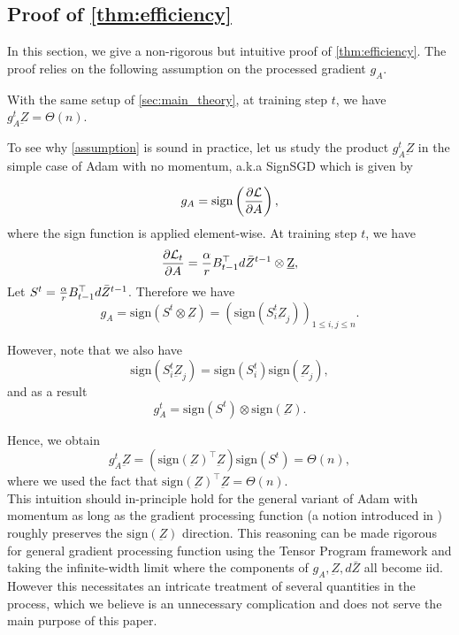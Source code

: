 \subsection{Proof of \texorpdfstring{\cref{thm:efficiency}}{Theorem Efficiency}}


In this section, we give a non-rigorous but intuitive proof of \cref{thm:efficiency}. The proof relies on the following assumption on the processed gradient $g_A$.

\begin{assumption}\label{assumption}
With the same setup of \cref{sec:main_theory}, at training step $t$, we have $g_A^{t} \underbar{Z} = \Theta(n)$.    
\end{assumption}
To see why \cref{assumption} is sound in practice, let us study the product $g_A^{t} \underbar{Z}$ in the simple case of Adam with no momentum, a.k.a SignSGD which is given by  

$$
g_A = \textrm{sign}\left(\frac{\partial \mathcal{L}}{\partial A}\right),
$$
where the sign function is applied element-wise. At training step $t$, we have 
$$
\frac{\partial \mathcal{L}_{t}}{\partial A} = \frac{\alpha}{r} B^\top_{t-1} d\Bar{Z}^{t-1} \otimes \underbar{Z},
$$
Let $S^t = \frac{\alpha}{r} B^\top_{t-1} d\Bar{Z}^{t-1}$. Therefore we have 
$$
g_A = \textrm{sign}(S^t \otimes \underbar{Z}) = (\textrm{sign}(S^t_{i} \underbar{Z}_j))_{1\leq i, j \leq n}.
$$

However, note that we also have 
$$
\textrm{sign}(S^t_{i} \underbar{Z}_j) = \textrm{sign}(S^t_{i}) \textrm{sign}(\underbar{Z}_j),
$$
and as a result  
$$
g_A^{t} = \textrm{sign}(S^t) \otimes \textrm{sign}(\underbar{Z}).
$$

Hence, we obtain 
$$
g_A^{t} \underbar{Z} = (\textrm{sign}(\underbar{Z})^\top \underbar{Z} ) \textrm{sign}(S^t) = \Theta(n),
$$
where we used the fact that $\textrm{sign}(\underbar{Z})^\top \underbar{Z} = \Theta(n)$.\\

This intuition should in-principle hold for the general variant of Adam with momentum as long as the gradient processing function (a notion introduced in \cite{yang2013theory}) roughly preserves the $\textrm{sign}(\underbar{Z})$ direction. This reasoning can be made rigorous for general gradient processing function using the Tensor Program framework and taking the infinite-width limit where the components of $g_A, \underbar{Z}, d\bar{Z}$ all become iid. However this necessitates an intricate treatment of several quantities in the process, which we believe is an unnecessary complication and does not serve the main purpose of this paper. 

